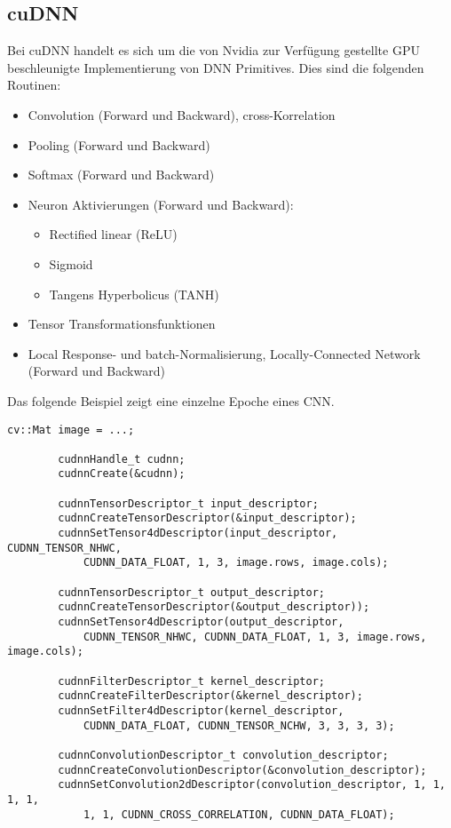 		\subsection{cuDNN}
		\autocite{cudnnDoc}Bei cuDNN handelt es sich um die von Nvidia zur Verfügung gestellte GPU beschleunigte Implementierung von DNN Primitives. Dies sind die folgenden Routinen:
		\begin{itemize}
    		\item Convolution (Forward und Backward), cross-Korrelation
    		\item Pooling (Forward und Backward)
    		\item Softmax (Forward und Backward)
    		\item Neuron Aktivierungen (Forward und Backward):
			\begin{itemize}			        
        		\item Rectified linear (ReLU)
        		\item Sigmoid
        		\item Tangens Hyperbolicus (TANH)
        	\end{itemize}
    		\item Tensor Transformationsfunktionen
    		\item Local Response- und batch-Normalisierung, Locally-Connected Network (Forward und Backward)
    	\end{itemize}
    	
    	Das folgende Beispiel zeigt eine einzelne Epoche eines CNN.
    	\begin{lstlisting}[caption=cuDNN: Tensor-Descriptors]    	
		cv::Mat image = ...;
    	
		cudnnHandle_t cudnn;
		cudnnCreate(&cudnn);

		cudnnTensorDescriptor_t input_descriptor;
		cudnnCreateTensorDescriptor(&input_descriptor);
		cudnnSetTensor4dDescriptor(input_descriptor, CUDNN_TENSOR_NHWC, 
			CUDNN_DATA_FLOAT, 1, 3, image.rows, image.cols);

		cudnnTensorDescriptor_t output_descriptor;
		cudnnCreateTensorDescriptor(&output_descriptor));
		cudnnSetTensor4dDescriptor(output_descriptor,
			CUDNN_TENSOR_NHWC, CUDNN_DATA_FLOAT, 1, 3, image.rows, image.cols);

		cudnnFilterDescriptor_t kernel_descriptor;
		cudnnCreateFilterDescriptor(&kernel_descriptor);
		cudnnSetFilter4dDescriptor(kernel_descriptor,
			CUDNN_DATA_FLOAT, CUDNN_TENSOR_NCHW, 3, 3, 3, 3);

		cudnnConvolutionDescriptor_t convolution_descriptor;
		cudnnCreateConvolutionDescriptor(&convolution_descriptor);
		cudnnSetConvolution2dDescriptor(convolution_descriptor, 1, 1, 1, 1,
			1, 1, CUDNN_CROSS_CORRELATION, CUDNN_DATA_FLOAT);
		\end{lstlisting}

